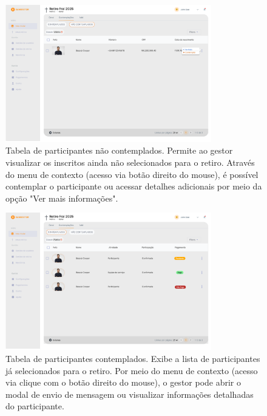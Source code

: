 \begin{figure}[H]
\centering
\includegraphics[width=0.8\textwidth]{images/prototipacao/gestao_retiros_geral/NaoContemplados.png}
\caption{Tabela de participantes não contemplados. Permite ao gestor visualizar os inscritos ainda não selecionados para o retiro. Através do menu de contexto (acesso via botão direito do mouse), é possível contemplar o participante ou acessar detalhes adicionais por meio da opção "Ver mais informações".}
\end{figure}

\begin{figure}[H]
\centering
\includegraphics[width=0.8\textwidth]{images/prototipacao/gestao_retiros_geral/Contemplados-1.png}
\caption{Tabela de participantes contemplados. Exibe a lista de participantes já selecionados para o retiro. Por meio do menu de contexto (acesso via clique com o botão direito do mouse), o gestor pode abrir o modal de envio de mensagem ou visualizar informações detalhadas do participante.}
\end{figure}

